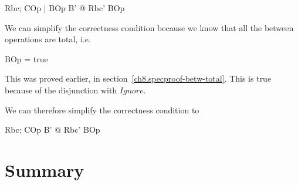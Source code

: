 \begin{gzed}
  Rbc; COp | \pre BOp
  \shows \exists B' @ Rbc' \land BOp
\end{gzed}

We can simplify the correctness condition because we know that all
the between operations are total, i.e.
\begin{gzed}
\pre BOp = true
\end{gzed}
This was proved earlier, in section~\ref{ch8.specproof-betw-total}.
This is true because of the  disjunction with $Ignore$.

We can therefore simplify the correctness condition to
\begin{gzed}
  Rbc; COp
  \shows \exists B' @ Rbc' \land BOp
\end{gzed}

\newpage

\section{Summary}\label{ch25.summary}

\ldefsummary %
\lthmsummary %
\lthmaddeddefsummary %
\lthmaddedthmsummary %
\lzevessummary %
